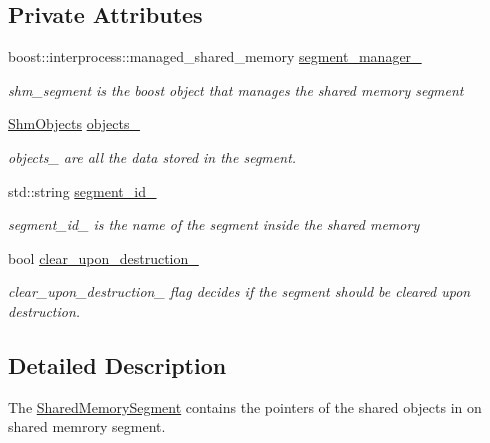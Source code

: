 \subsection*{Private Attributes}
\begin{DoxyCompactItemize}
\item 
\mbox{\label{classshared__memory_1_1SharedMemorySegment_af775c0982687b6e9bc9856b21aa1e009}} 
boost\+::interprocess\+::managed\+\_\+shared\+\_\+memory \hyperlink{classshared__memory_1_1SharedMemorySegment_af775c0982687b6e9bc9856b21aa1e009}{segment\+\_\+manager\+\_\+}
\begin{DoxyCompactList}\small\item\em shm\+\_\+segment is the boost object that manages the shared memory segment \end{DoxyCompactList}\item 
\hyperlink{namespaceshared__memory_ae50b2192256821112a69e47d5314b467}{Shm\+Objects} \hyperlink{classshared__memory_1_1SharedMemorySegment_a8c4d0eb6f2a620bf7e5b22a57c07380b}{objects\+\_\+}
\begin{DoxyCompactList}\small\item\em objects\+\_\+ are all the data stored in the segment. \end{DoxyCompactList}\item 
\mbox{\label{classshared__memory_1_1SharedMemorySegment_a08408dc6b860388eb3b08e493f0188d9}} 
std\+::string \hyperlink{classshared__memory_1_1SharedMemorySegment_a08408dc6b860388eb3b08e493f0188d9}{segment\+\_\+id\+\_\+}
\begin{DoxyCompactList}\small\item\em segment\+\_\+id\+\_\+ is the name of the segment inside the shared memory \end{DoxyCompactList}\item 
bool \hyperlink{classshared__memory_1_1SharedMemorySegment_af50ac70dca284926b15803f86958b220}{clear\+\_\+upon\+\_\+destruction\+\_\+}
\begin{DoxyCompactList}\small\item\em clear\+\_\+upon\+\_\+destruction\+\_\+ flag decides if the segment should be cleared upon destruction. \end{DoxyCompactList}\end{DoxyCompactItemize}


\subsection{Detailed Description}
The \hyperlink{classshared__memory_1_1SharedMemorySegment}{Shared\+Memory\+Segment} contains the pointers of the shared objects in on shared memrory segment. 

